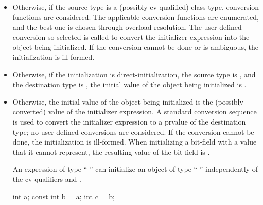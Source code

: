 \begin{itemize}
\begin{itemize}
\item
Otherwise (i.e., for the remaining copy-initialization cases),
user-defined conversions that can convert from the
source type to the destination type or (when a conversion function
is used) to a derived class thereof are enumerated as described in~\ref{over.match.copy},
and the best one is chosen through overload resolution.
If the conversion cannot be done or
is ambiguous, the initialization is ill-formed.  The function
selected is called with the initializer expression as its
argument; if the function is a constructor, the call is a prvalue
of the cv-unqualified version of the
destination type whose result object is initialized by the constructor.
The call is used
to direct-initialize, according to the rules above, the object
that is the destination of the copy-initialization.
\end{itemize}

\item
Otherwise, if the source type
is a (possibly cv-qualified) class type, conversion functions are
considered.
The applicable conversion functions are enumerated,
and the best one is chosen through overload
resolution.
The user-defined conversion so selected
is called to convert the initializer expression into the
object being initialized.
If the conversion cannot be done or is
ambiguous, the initialization is ill-formed.
\item
Otherwise, if the initialization is direct-initialization,
the source type is , and
the destination type is ,
the initial value of the object being initialized is .
\item
Otherwise, the initial value of the object being initialized is
the (possibly converted) value of the initializer expression.
A standard conversion sequence is used
to convert the initializer expression to
a prvalue of
the destination type;
no user-defined conversions are considered.
If the conversion cannot
be done, the initialization is ill-formed.
When initializing a bit-field with a value that it cannot represent, the
resulting value of the bit-field is
.
%
\begin{note}
An expression of type
`` ''
can initialize an object of type
`` ''
independently of
the cv-qualifiers
and .

\begin{codeblock}
int a;
const int b = a;
int c = b;
\end{codeblock}
\end{note}
\end{itemize}

